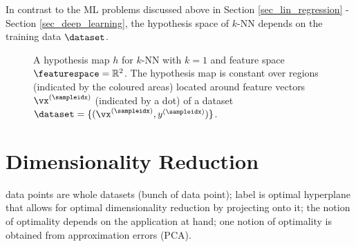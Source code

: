 \documentclass[12pt]{report}
\def\biglen{20cm} %
\def\maxxy{4} %
\begin{document}
In contrast to the ML problems discussed above in Section \ref{sec_lin_regression} - Section \ref{sec_deep_learning}, 
the hypothesis space of $k$-NN depends on the training data $\dataset$. 
\begin{figure}[htbp]
    \centering
    \label{fig_voronoi}
        \caption{A hypothesis map $h$ for $k$-NN with $k=1$ and feature space $\featurespace = \mathbb{R}^{2}$. 
        	The hypothesis map is constant over regions (indicated by the coloured areas) located around feature 
        	vectors $\vx^{(\sampleidx)}$ (indicated by a dot) of a dataset $\dataset=\{(\vx^{(\sampleidx)},y^{(\sampleidx)})\}$.}
\end{figure}

\section{Dimensionality Reduction} 
\label{sec_dim_reduction}
data points are whole datasets (bunch of data point); label is optimal hyperplane that allows 
for optimal dimensionality reduction by projecting onto it; the notion of optimality depends 
on the application at hand; one notion of optimality is obtained from approximation errors (PCA).  
\end{document}
